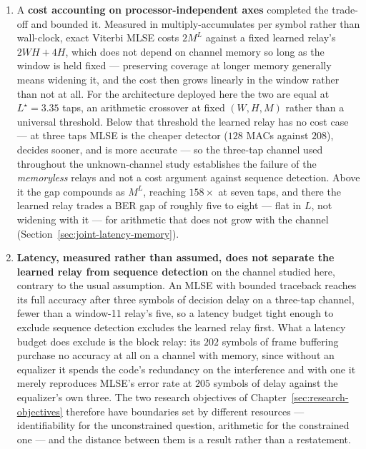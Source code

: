 \begin{enumerate}
    \item A \textbf{cost accounting on processor-independent axes} completed the trade-off and bounded it. Measured in multiply-accumulates per symbol rather than wall-clock, exact Viterbi MLSE costs $2M^{L}$ against a fixed learned relay's $2WH+4H$, which does not depend on channel memory so long as the window is held fixed --- preserving coverage at longer memory generally means widening it, and the cost then grows linearly in the window rather than not at all. For the architecture deployed here the two are equal at $L^{\star}=3.35$ taps, an arithmetic crossover at fixed $(W,H,M)$ rather than a universal threshold. Below that threshold the learned relay has no cost case --- at three taps MLSE is the cheaper detector ($128$ MACs against $208$), decides sooner, and is more accurate --- so the three-tap channel used throughout the unknown-channel study establishes the failure of the \emph{memoryless} relays and not a cost argument against sequence detection. Above it the gap compounds as $M^{L}$, reaching $158\times$ at seven taps, and there the learned relay trades a BER gap of roughly five to eight --- flat in $L$, not widening with it --- for arithmetic that does not grow with the channel (Section~\ref{sec:joint-latency-memory}).

    \item \textbf{Latency, measured rather than assumed, does not separate the learned relay from sequence detection} on the channel studied here, contrary to the usual assumption. An MLSE with bounded traceback reaches its full accuracy after three symbols of decision delay on a three-tap channel, fewer than a window-11 relay's five, so a latency budget tight enough to exclude sequence detection excludes the learned relay first. What a latency budget does exclude is the block relay: its $202$ symbols of frame buffering purchase no accuracy at all on a channel with memory, since without an equalizer it spends the code's redundancy on the interference and with one it merely reproduces MLSE's error rate at $205$ symbols of delay against the equalizer's own three. The two research objectives of Chapter~\ref{sec:research-objectives} therefore have boundaries set by different resources --- identifiability for the unconstrained question, arithmetic for the constrained one --- and the distance between them is a result rather than a restatement.
\end{enumerate}

